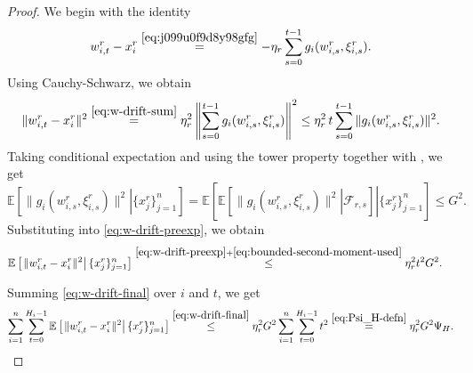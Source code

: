 \documentclass{article}
\newcommand{\cF}{\mathcal{F}}
\newcommand{\ExpCond}[2]{{\mathbb{E}}\left[\left.#1\right\vert#2\right]}
\theoremstyle{plain}
\theoremstyle{definition}
\begin{document}
\begin{proof}
We begin with the identity
\begin{equation}
w_{i,t}^r - x_i^r
\overset{\eqref{eq:j099u0f9d8y98gfg}}{=}
-\eta_r \sum_{s=0}^{t-1} g_i(w_{i,s}^r,\xi_{i,s}^r).
\label{eq:w-drift-sum}
\end{equation}
Using Cauchy-Schwarz, we obtain
\begin{equation}
\|w_{i,t}^r - x_i^r\|^2
\overset{\eqref{eq:w-drift-sum}}{=}
\eta_r^2 \left\|\sum_{s=0}^{t-1} g_i(w_{i,s}^r,\xi_{i,s}^r)\right\|^2
\leq 
\eta_r^2\, t \sum_{s=0}^{t-1} \|g_i(w_{i,s}^r,\xi_{i,s}^r)\|^2.
\label{eq:w-drift-preexp}
\end{equation}
Taking conditional expectation and using the tower property together with , we get
\begin{equation}
\ExpCond{\|g_i(w_{i,s}^r,\xi_{i,s}^r)\|^2}{\{x_j^r\}_{j=1}^n}
=
\ExpCond{\ExpCond{\|g_i(w_{i,s}^r,\xi_{i,s}^r)\|^2}{\cF_{r,s}}
}{\{x_j^r\}_{j=1}^n}
\leq
G^2.
\label{eq:bounded-second-moment-used}
\end{equation}
Substituting into \eqref{eq:w-drift-preexp}, we obtain
\begin{align}
\ExpCond{\|w_{i,t}^r - x_i^r\|^2}{\{x_j^r\}_{j=1}^n}
&\overset{\eqref{eq:w-drift-preexp} + \eqref{eq:bounded-second-moment-used}}{\le}
\eta_r^2 t^2 G^2.
\label{eq:w-drift-final}
\end{align}

Summing \eqref{eq:w-drift-final} over \(i\) and \(t\), we get
\begin{equation*}
\sum_{i=1}^n \sum_{t=0}^{H_i-1}
\ExpCond{\|w_{i,t}^r - x_i^r\|^2}{\{x_j^r\}_{j=1}^n}
\overset{\eqref{eq:w-drift-final}}{\le}
\eta_r^2 G^2 \sum_{i=1}^n \sum_{t=0}^{H_i-1} t^2
\overset{\eqref{eq:Psi_H-defn}}{=}
\eta_r^2 G^2 \Psi_H.
\end{equation*}


\end{proof}
\end{document}
